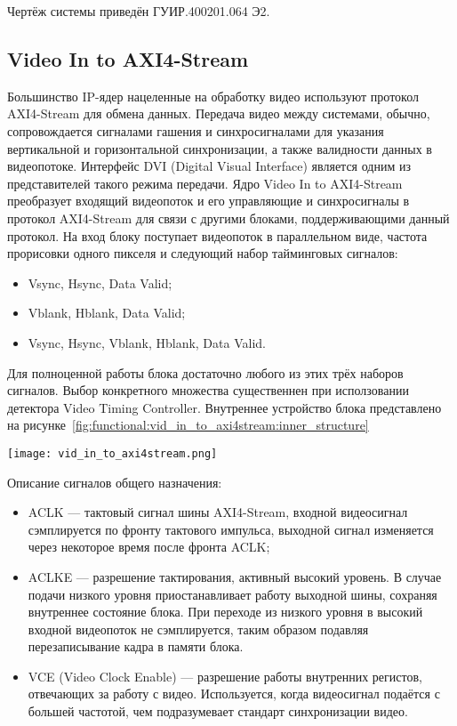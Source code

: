 Чертёж системы приведён ГУИР.400201.064 Э2.

\subsection{Video In to AXI4-Stream}
\label{sec:functional:video_in_to_axi4stream}
Большинство IP-ядер нацеленные на обработку видео используют протокол AXI4-Stream для
обмена данных. Передача видео между системами, обычно, сопровождается сигналами гашения и
синхросигналами для указания вертикальной и горизонтальной синхронизации, а также
валидности данных в видеопотоке. Интерфейс DVI (Digital Visual Interface) является
одним из представителей такого режима передачи. Ядро Video In to AXI4-Stream преобразует
входящий видеопоток и его управляющие и синхросигналы в протокол AXI4-Stream для
связи с другими блоками, поддерживающими данный протокол. На вход блоку поступает
видеопоток в параллельном виде, частота прорисовки одного пикселя и следующий набор
тайминговых сигналов:

\begin{itemize}
  \item Vsync, Hsync, Data Valid;
  \item Vblank, Hblank, Data Valid;
  \item Vsync, Hsync, Vblank, Hblank, Data Valid.
\end{itemize}

Для полноценной работы блока достаточно любого из этих трёх наборов сигналов. Выбор конкретного
множества существеннен при исползовании детектора Video Timing Controller.
Внутреннее устройство блока представлено на рисунке~\ref{fig:functional:vid_in_to_axi4stream:inner_structure}

\begin{center}
  \centering
  \texttt{[image: vid\_in\_to\_axi4stream.png]}
  \label{fig:functional:vid_in_to_axi4stream:inner_structure}
\end{center}

Описание сигналов общего назначения:

\begin{itemize}
  \item ACLK --- тактовый сигнал шины AXI4-Stream, входной видеосигнал сэмплируется по фронту
    тактового импульса, выходной сигнал  изменяется через некоторое время после фронта ACLK;
  \item ACLKE --- разрешение тактирования, активный высокий уровень. В случае подачи низкого уровня
    приостанавливает работу выходной шины, сохраняя внутреннее состояние блока. При переходе
    из низкого уровня в высокий входной видеопоток не сэмплируется, таким образом подавляя перезаписывание
    кадра в памяти блока.
  \item VCE (Video Clock Enable) --- разрешение работы внутренних регистов, отвечающих за работу с видео.
    Используется, когда видеосигнал подаётся с большей частотой, чем подразумевает стандарт синхронизации видео.
\end{itemize}

